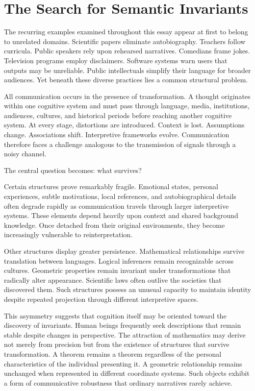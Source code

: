 \documentclass[11pt]{article}
\theoremstyle{plain}
\begin{document}
\section{The Search for Semantic Invariants}

The recurring examples examined throughout this essay appear at first to belong to unrelated domains. Scientific papers eliminate autobiography. Teachers follow curricula. Public speakers rely upon rehearsed narratives. Comedians frame jokes. Television programs employ disclaimers. Software systems warn users that outputs may be unreliable. Public intellectuals simplify their language for broader audiences. Yet beneath these diverse practices lies a common structural problem.

All communication occurs in the presence of transformation. A thought originates within one cognitive system and must pass through language, media, institutions, audiences, cultures, and historical periods before reaching another cognitive system. At every stage, distortions are introduced. Context is lost. Assumptions change. Associations shift. Interpretive frameworks evolve. Communication therefore faces a challenge analogous to the transmission of signals through a noisy channel.

The central question becomes: what survives?

Certain structures prove remarkably fragile. Emotional states, personal experiences, subtle motivations, local references, and autobiographical details often degrade rapidly as communication travels through larger interpretive systems. These elements depend heavily upon context and shared background knowledge. Once detached from their original environments, they become increasingly vulnerable to reinterpretation.

Other structures display greater persistence. Mathematical relationships survive translation between languages. Logical inferences remain recognizable across cultures. Geometric properties remain invariant under transformations that radically alter appearance. Scientific laws often outlive the societies that discovered them. Such structures possess an unusual capacity to maintain identity despite repeated projection through different interpretive spaces.

This asymmetry suggests that cognition itself may be oriented toward the discovery of invariants. Human beings frequently seek descriptions that remain stable despite changes in perspective. The attraction of mathematics may derive not merely from precision but from the existence of structures that survive transformation. A theorem remains a theorem regardless of the personal characteristics of the individual presenting it. A geometric relationship remains unchanged when represented in different coordinate systems. Such objects exhibit a form of communicative robustness that ordinary narratives rarely achieve.
\end{document}
